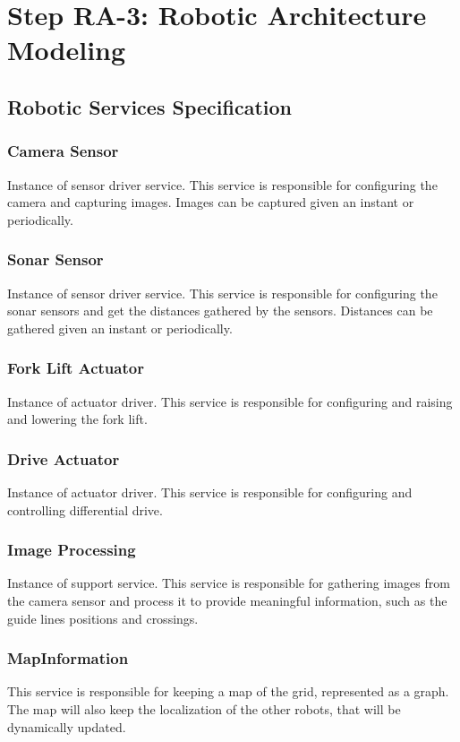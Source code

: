 \section{Step RA-3: Robotic Architecture Modeling}
\subsection{Robotic Services Specification}
\subsubsection*{Camera Sensor}
Instance of sensor driver service. This service is responsible for configuring the camera and capturing images. Images can be captured given an instant or periodically.

\subsubsection*{Sonar Sensor}
Instance of sensor driver service. This service is responsible for configuring the sonar sensors and get the distances gathered by the sensors. Distances can be gathered given an instant or periodically.

\subsubsection*{Fork Lift Actuator}
Instance of actuator driver. This service is responsible for configuring and raising and lowering the fork lift.

\subsubsection*{Drive Actuator}
Instance of actuator driver. This service is responsible for configuring and controlling differential drive.

\subsubsection*{Image Processing}
Instance of support service. This service is responsible for gathering images from the camera sensor and process it to provide meaningful information, such as the guide lines positions and crossings.

\subsubsection*{MapInformation}
This service is responsible for keeping a map of the grid, represented as a graph. The map will also keep the localization of the other robots, that will be dynamically updated.

